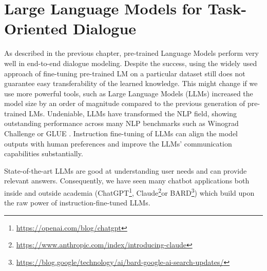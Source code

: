 \chapter{Large Language Models for Task-Oriented Dialogue}
\label{chap:llms}

\label{07:sec:intro}
As described in the previous chapter, pre-trained Language Models perform very well in end-to-end dialogue modeling.
Despite the success, using the widely used approach of fine-tuning pre-trained LM on a particular dataset still does not guarantee easy transferability of the learned knowledge.
This might change if we use more powerful tools, such as 
Large Language Models (LLMs) increased the model size by an order of magnitude compared to the previous generation of pre-trained LMs.
Undeniable, LLMs have transformed the NLP field,
showing outstanding performance across many NLP benchmarks such as Winograd Challenge \cite{levesque2012winograd} or GLUE \cite{wang2018glue}.
Instruction fine-tuning of LLMs can align the model outputs with human preferences \cite{ouyang2022training,supernaturalinstructions} and improve the LLMs' communication capabilities substantially.

State-of-the-art LLMs are good at understanding user needs and can provide relevant answers.
Consequently, we have seen many chatbot applications both inside and outside academia (ChatGPT\footnote{\url{https://openai.com/blog/chatgpt}}, Claude\footnote{\url{https://www.anthropic.com/index/introducing-claude}}or BARD\footnote{\url{https://blog.google/technology/ai/bard-google-ai-search-updates/}}) which build upon the raw power of instruction-fine-tuned LLMs.


